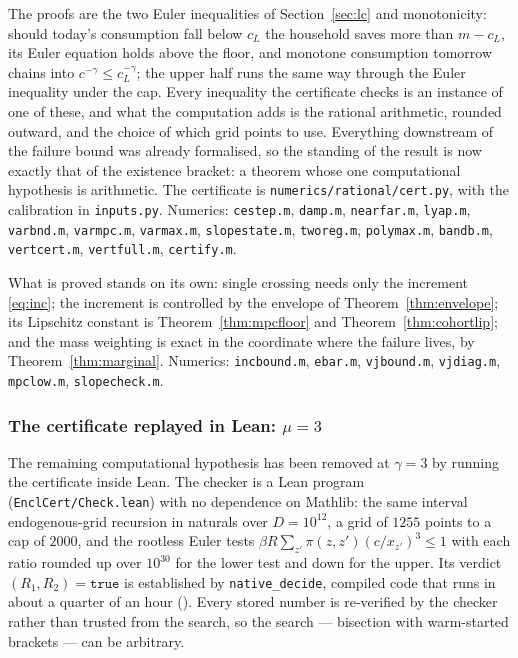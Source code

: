 The proofs are the two Euler inequalities of Section~\ref{sec:lc} and monotonicity: should today's
consumption fall below $c_L$ the household saves more than $m-c_L$, its Euler equation holds above
the floor, and monotone consumption tomorrow chains into $c^{-\gamma}\le c_L^{-\gamma}$; the upper
half runs the same way through the Euler inequality under the cap. Every inequality the certificate
checks is an instance of one of these, and what the computation adds is the rational arithmetic,
rounded outward, and the choice of which grid points to use. Everything downstream of the failure
bound was already formalised, so the standing of the result is now exactly that of the
existence bracket: a theorem whose one computational hypothesis is arithmetic. The certificate is
\texttt{numerics/rational/cert.py}, with the calibration in \texttt{inputs.py}. Numerics: \texttt{cestep.m}, \texttt{damp.m},
\texttt{nearfar.m}, \texttt{lyap.m}, \texttt{varbnd.m}, \texttt{varmpc.m}, \texttt{varmax.m},
\texttt{slopestate.m}, \texttt{tworeg.m}, \texttt{polymax.m}, \texttt{bandb.m}, \texttt{vertcert.m},
\texttt{vertfull.m}, \texttt{certify.m}.

What is proved stands on its own: single crossing needs only the increment \eqref{eq:inc}; the
increment is controlled by the envelope of Theorem~\ref{thm:envelope}; its Lipschitz constant is
Theorem~\ref{thm:mpcfloor} and Theorem~\ref{thm:cohortlip}; and the mass weighting is exact in the
coordinate where the failure lives, by Theorem~\ref{thm:marginal}. Numerics: \texttt{incbound.m},
\texttt{ebar.m}, \texttt{vjbound.m}, \texttt{vjdiag.m}, \texttt{mpclow.m}, \texttt{slopecheck.m}.

\subsubsection*{The certificate replayed in Lean: $\mu=3$}\label{sec:encllean}

The remaining computational hypothesis has been removed at $\gamma=3$ by running the certificate
inside Lean. The checker is a Lean program (\texttt{EnclCert/Check.lean}) with no dependence on
Mathlib: the same interval endogenous-grid recursion in naturals over $D=10^{12}$, a grid of $1255$
points to a cap of $2000$, and the rootless Euler tests $\beta R\sum_{z'}\pi(z,z')(c/x_{z'})^3\le1$
with each ratio rounded up over $10^{30}$ for the lower test and down for the upper. Its verdict
\,$(R_1,R_2)=\mathtt{true}$ is established by \texttt{native\_decide}, compiled
code that runs in about a quarter of an hour (). Every stored number is
re-verified by the checker rather than trusted from the search, so the search --- bisection with
warm-started brackets --- can be arbitrary.

